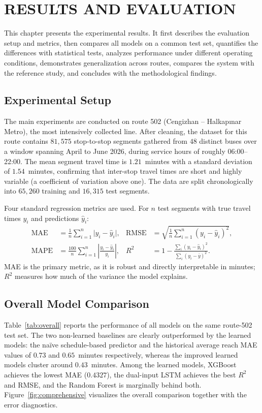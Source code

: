 \chapter{RESULTS AND EVALUATION}

This chapter presents the experimental results. It first describes the evaluation setup and metrics, then compares all models on a common test set, quantifies the differences with statistical tests, analyzes performance under different operating conditions, demonstrates generalization across routes, compares the system with the reference study, and concludes with the methodological findings.

\section{Experimental Setup}

The main experiments are conducted on route 502 (Cengizhan -- Halkapınar Metro), the most intensively collected line. After cleaning, the dataset for this route contains $81{,}575$ stop-to-stop segments gathered from $48$ distinct buses over a window spanning April to June 2026, during service hours of roughly 06:00--22:00. The mean segment travel time is $1.21$~minutes with a standard deviation of $1.54$~minutes, confirming that inter-stop travel times are short and highly variable (a coefficient of variation above one). The data are split chronologically into $65{,}260$ training and $16{,}315$ test segments.

Four standard regression metrics are used. For $n$ test segments with true travel times $y_i$ and predictions $\hat{y}_i$:
\begin{align}
\text{MAE} &= \frac{1}{n}\sum_{i=1}^{n}\lvert y_i - \hat{y}_i\rvert, &
\text{RMSE} &= \sqrt{\frac{1}{n}\sum_{i=1}^{n}(y_i - \hat{y}_i)^2}, \\
\text{MAPE} &= \frac{100}{n}\sum_{i=1}^{n}\left\lvert\frac{y_i - \hat{y}_i}{y_i}\right\rvert, &
R^2 &= 1 - \frac{\sum_i (y_i-\hat{y}_i)^2}{\sum_i (y_i-\bar{y})^2}.
\end{align}
MAE is the primary metric, as it is robust and directly interpretable in minutes; $R^2$ measures how much of the variance the model explains.

\section{Overall Model Comparison}

Table~\ref{tab:overall} reports the performance of all models on the same route-502 test set. The two non-learned baselines are clearly outperformed by the learned models: the naïve schedule-based predictor and the historical average reach MAE values of $0.73$ and $0.65$~minutes respectively, whereas the improved learned models cluster around $0.43$~minutes. Among the learned models, XGBoost achieves the lowest MAE ($0.4327$), the dual-input LSTM achieves the best $R^2$ and RMSE, and the Random Forest is marginally behind both. Figure~\ref{fig:comprehensive} visualizes the overall comparison together with the error diagnostics.

